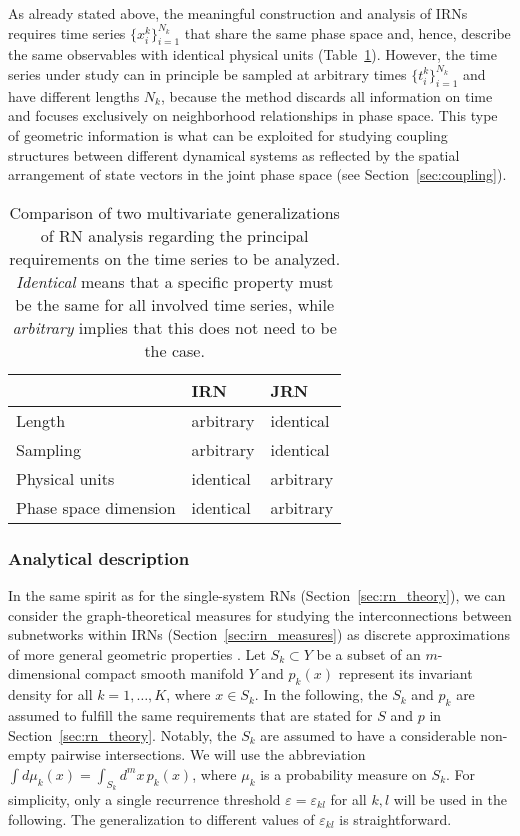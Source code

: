 As already stated above, the meaningful construction and analysis of IRNs requires time series $\{x_i^k\}_{i=1}^{N_k}$ that share the same phase space and, hence, describe the same observables with identical physical units (Table~\ref{tab:multivariate_rns}). However, the time series under study can in principle be sampled at arbitrary times $\{t^k_i\}_{i=1}^{N_k}$ and have different lengths $N_k$, because the method discards all information on time and focuses exclusively on neighborhood relationships in phase space. This type of geometric information is what can be exploited for studying coupling structures between different dynamical systems as reflected by the spatial arrangement of state vectors in the joint phase space (see Section~\ref{sec:coupling}).

\begin{table}[tb]
\caption[Multivariate generalizations of recurrence network analysis]{Comparison of two multivariate generalizations of RN analysis regarding the principal requirements on the time series to be analyzed. \emph{Identical} means that a specific property must be the same for all involved time series, while \emph{arbitrary} implies that this does not need to be the case.}
\centering
\setlength{\tabcolsep}{0.2cm}
\begin{tabular}{lll}
\hline
& IRN & JRN \\
\hline
Length & arbitrary & identical \\
Sampling & arbitrary & identical \\
Physical units & identical & arbitrary \\
Phase space dimension & identical & arbitrary \\
\hline
\end{tabular}
\label{tab:multivariate_rns}
\end{table}%



\subsubsection{Analytical description}

In the same spirit as for the single-system RNs (Section~\ref{sec:rn_theory}), we can consider the graph-theoretical measures for studying the interconnections between subnetworks within IRNs (Section~\ref{sec:irn_measures}) as discrete approximations of more general geometric properties \cite{Donges2012PhD}. Let $S_k \subset Y$ be a subset of an $m$-dimensional compact smooth manifold $Y$ and $p_k(x)$ represent its invariant density for all $k=1,\dots,K$, where $x\in S_k$. In the following, the $S_k$ and $p_k$ are assumed to fulfill the same requirements that are stated for $S$ and $p$ in Section~\ref{sec:rn_theory}. Notably, the $S_k$ are assumed to have a considerable non-empty pairwise intersections. We will use the abbreviation $\int d\mu_k(x)=\int_{S_k} d^mx\,p_k(x)$, where $\mu_k$ is a probability measure on $S_k$. For simplicity, only a single recurrence threshold $\varepsilon=\varepsilon_{kl}$ for all $k,l$ will be used in the following. The generalization to different values of $\varepsilon_{kl}$ is straightforward.

